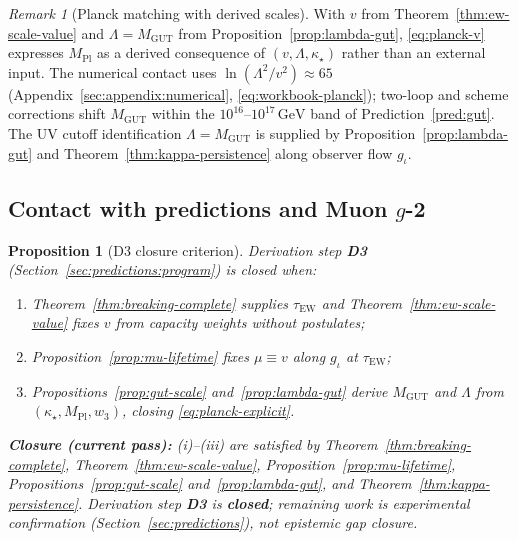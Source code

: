 \documentclass[11pt]{article}
\theoremstyle{plain}
\newtheorem{proposition}[theorem]{Proposition}
\theoremstyle{definition}
\theoremstyle{remark}
\newtheorem{remark}[theorem]{Remark}
\numberwithin{equation}{section}
\newcommand{\MPl}{M_{\mathrm{Pl}}}
\begin{document}
\begin{remark}[Planck matching with derived scales]
With $v$ from Theorem~\ref{thm:ew-scale-value} and
$\Lambda=M_{\mathrm{GUT}}$ from Proposition~\ref{prop:lambda-gut},
\eqref{eq:planck-v} expresses $\MPl$ as a derived consequence of
$(v,\Lambda,\kappa_\star)$ rather than an external input. The numerical
contact uses $\ln(\Lambda^2/v^2)\approx 65$ (Appendix~\ref{sec:appendix:numerical},
\eqref{eq:workbook-planck}); two-loop and scheme corrections shift
$M_{\mathrm{GUT}}$ within the $10^{16}$--$10^{17}\,\mathrm{GeV}$ band of
Prediction~\ref{pred:gut}. The UV cutoff identification $\Lambda=M_{\mathrm{GUT}}$ is supplied by
Proposition~\ref{prop:lambda-gut} and Theorem~\ref{thm:kappa-persistence}
along observer flow $g_\iota$.
\end{remark}

\subsection{Contact with predictions and Muon $g$-2}
\label{sec:scales:contact}

\begin{proposition}[D3 closure criterion]
\label{prop:d3-closure}
Derivation step \textbf{D3} (Section~\ref{sec:predictions:program}) is
\emph{closed} when:
\begin{enumerate}[label=(\roman*),leftmargin=*]
  \item Theorem~\ref{thm:breaking-complete} supplies
    $\tau_{\mathrm{EW}}$ and Theorem~\ref{thm:ew-scale-value} fixes $v$
    from capacity weights without postulates;
  \item Proposition~\ref{prop:mu-lifetime} fixes $\mu\equiv v$ along
    $g_\iota$ at $\tau_{\mathrm{EW}}$;
  \item Propositions~\ref{prop:gut-scale} and~\ref{prop:lambda-gut} derive
    $M_{\mathrm{GUT}}$ and $\Lambda$ from $(\kappa_\star,\MPl,w_3)$, closing
    \eqref{eq:planck-explicit}.
\end{enumerate}
\textbf{Closure (current pass):} (i)--(iii) are satisfied by
Theorem~\ref{thm:breaking-complete}, Theorem~\ref{thm:ew-scale-value},
Proposition~\ref{prop:mu-lifetime}, Propositions~\ref{prop:gut-scale}
and~\ref{prop:lambda-gut}, and Theorem~\ref{thm:kappa-persistence}.
Derivation step \textbf{D3} is \textbf{closed}; remaining work is experimental
confirmation (Section~\ref{sec:predictions}), not epistemic gap closure.
\end{proposition}
\end{document}
